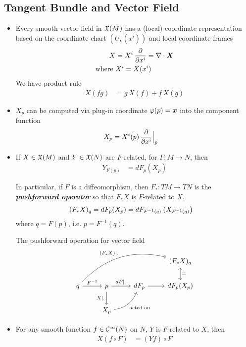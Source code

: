 \documentclass[11pt]{article}
\begin{document}
\subsection{Tangent Bundle and Vector Field}
\begin{itemize}
\item Every smooth vector field in ${\mathfrak X}(M)$ has a (local) coordinate representation based on the coordinate chart $(U, (x^i))$ and local coordinate frames
\begin{align*}
X &= X^i\, \frac{\partial }{ \partial x^i} = \nabla \cdot \boldsymbol{X} \\
\text{where }&X^i = X(x^i) 
\end{align*}We have product rule
\begin{align*}
X(fg) &= g\,X(f) + f\,X(g)
\end{align*}


\item $X_p$ can be computed via plug-in coordinate $\varphi(p)= \boldsymbol{x}$ into the component function
\begin{align*}
X_p &= X^i(p)\, \frac{\partial }{ \partial x^i}\Bigr|_{p} 
\end{align*} 

\item If $X \in {\mathfrak X}(M)$ and $Y \in {\mathfrak X}(N)$ are $F$-related, for $F: M\rightarrow N$, then 
\begin{align}
Y_{F(p)} &= dF_{p}(X_p) \label{eqn: F_related}
\end{align} 

 In particular, if $F$ is a diffeomorphism, then $F_{*}: TM \rightarrow TN$ is the \emph{\textbf{pushforward operator}} so that $F_{*}X$ is $F$-related to $X$. 
\begin{align*}
(F_{*}X)_{q} &= dF_{p}(X_p) = dF_{F^{-1}(q)}\left(X_{F^{-1}(q)}\right)
\end{align*}  where $q = F(p)$, i.e. $p = F^{-1}(q)$.
\begin{remark} 
The pushforward operation for vector field
\[
  \begin{tikzcd}
                     &                                                                                     &  & (F_{*}X)_{q} \arrow[d, leftrightarrow, "="] \\
     q \arrow{r}{F^{-1}} \arrow[rrru, bend left, "(F_{*}X)|_{\cdot}"] & p  \arrow{r}{dF|_{\cdot}} \arrow[swap]{d}{X|_{\cdot}}&  dF_p \arrow{r}{}& dF_p(X_p)  \\
     &  X_p  \arrow[ru, swap, bend right, "\text{acted on}"]  & &
  \end{tikzcd}
\] 
\end{remark}

\item For any smooth function $f \in {\mathcal C}^{\infty}(N)$ on $N$, $Y$ is $F$-related to $X$, then 
\begin{align}
X(f \circ F) &= (Yf) \circ F \label{eqn: F_related_act_on_f}
\end{align}

\end{itemize}
\end{document}
